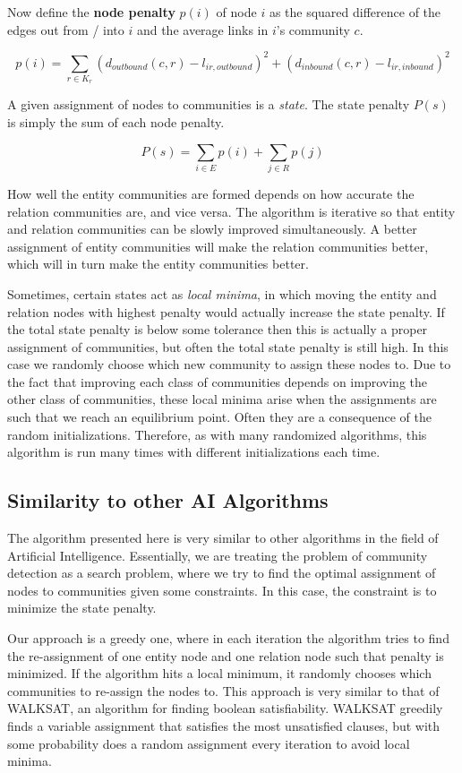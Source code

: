 \documentclass[12pt]{article}
\begin{document}
Now define the \textbf{node penalty} $p(i)$ of node $i$ as the squared difference
of the edges out from / into $i$ and the average links in $i$'s community $c$.

$$p(i) = \sum_{r \in K_r} (d_{outbound}(c,r) - l_{ir,outbound})^2 +
(d_{inbound}(c,r) - l_{ir, inbound})^2 $$

A given assignment of nodes to communities is a \textit{state}. The state penalty
$P(s)$ is simply the sum of each node penalty.

$$P(s) = \sum_{i \in E} p(i) + \sum_{j \in R} p(j)$$

How well the entity communities are formed depends on how accurate the relation
communities are, and vice versa. The algorithm is iterative so that entity and
relation communities can be slowly improved simultaneously. A better assignment
of entity communities will make the relation communities better, which will in
turn make the entity communities better.

Sometimes, certain states act as \textit{local minima}, in which moving the
entity and relation nodes with highest penalty would actually increase the state
penalty. If the total state penalty is below some tolerance then this is
actually a proper assignment of communities, but often the total state penalty
is still high. In this case we randomly choose which new community to assign
these nodes to. Due to the fact that improving each class of communities depends
on improving the other class of communities, these local minima arise when the
assignments are such that we reach an equilibrium point. Often they are a
consequence of the random initializations. Therefore, as with many randomized
algorithms, this algorithm is run many times with different initializations each
time.

\subsection{Similarity to other AI Algorithms}
\label{Similarity to other AI Algorithms}

The algorithm presented here is very similar to other algorithms in the field of
Artificial Intelligence. Essentially, we are treating the problem of community
detection as a search problem, where we try to find the optimal assignment
of nodes to communities given some constraints. In this case, the constraint is
to minimize the state penalty.

Our approach is a greedy one, where in each iteration the algorithm tries to
find the re-assignment of one entity node and one relation node such that
penalty is minimized. If the algorithm hits a local minimum, it randomly chooses
which communities to re-assign the nodes to. This approach is very similar to
that of  WALKSAT, an algorithm for finding boolean satisfiability. WALKSAT
greedily finds a variable assignment that satisfies the most unsatisfied
clauses, but with some probability does a random assignment every iteration to
avoid local minima.
\end{document}
